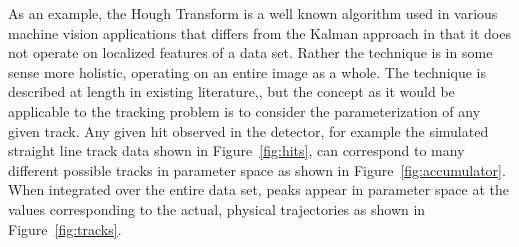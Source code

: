\documentclass{JINST}
\begin{document}
As an example, the Hough Transform is a well known algorithm used in various machine
vision applications that differs from the Kalman approach in that it does not operate on
localized features of a data set.  Rather the technique is in some sense more
holistic, operating on an entire image as a whole. 
The technique is described at length in existing literature\cite{bib:HT1},\cite{bib:HT2},
 but the concept as it would be applicable to the
tracking problem is to consider the parameterization of any given track.  Any given hit
observed in the detector, for example the simulated straight line track data shown in Figure~\ref{fig:hits}, 
can correspond to many different possible tracks in parameter space as shown in Figure~\ref{fig:accumulator}.  
When integrated over the entire data set, peaks appear in parameter space at the values corresponding to the actual, 
physical trajectories as shown in Figure~\ref{fig:tracks}.
\end{document}
